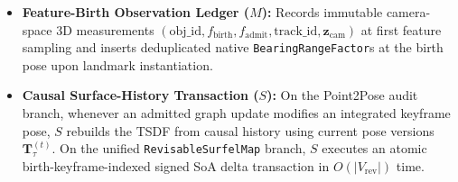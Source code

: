 \documentclass{evidencescene}
\begin{document}
\begin{itemize}
    Gate $R$ () executes four deterministic checks: (1) thin SVD landmark null-space projection $\bar{\mathbf{A}}_x=(\mathbf{I}-\mathbf{U}_{y,r}\mathbf{U}_{y,r}^\top)\mathbf{A}_x$ with $\tau_y=\epsilon_{\mathrm{mach}}\max(\operatorname{shape}(\mathbf{A}_y))\sigma_{\max}(\mathbf{A}_y)$; (2) worst-case multi-scale column-deletion rank $r_i^{\min}=\min_{s\in\{0.1,1,10\}}r_i(s)=6$; (3) continuous translational Schur conditioning on the $6\times 6$ pose marginal block $\mathbf{S}_i=(\bar{\mathbf{H}}_x)_{ii}-(\bar{\mathbf{H}}_x)_{i,-i}(\bar{\mathbf{H}}_x)_{-i,-i}^+(\bar{\mathbf{H}}_x)_{-i,i}$ and its $3\times 3$ translational complement $\mathbf{R}_i=\mathbf{S}_{i,tt}-\mathbf{S}_{i,tr}\mathbf{S}_{i,rr}^+\mathbf{S}_{i,rt}$, requiring $\sigma_{\min}(\mathbf{R}_i)\ge 10^{-4}$ and $\kappa(\mathbf{R}_i)\le 10^6$; and (4) atomic transaction retention on rejection. In \texttt{v2.4+}, for partially observable or rotationally symmetric objects where hard binary rejection is overly conservative,  decomposes $\mathbf{S}_i=\mathbf{V}\boldsymbol{\Lambda}\mathbf{V}^\top$ and projects the $\mathfrak{se}(3)$ tangent increment onto the well-conditioned subspace $\{\lambda_k\ge\tau_{\mathrm{obs}}\}$ while clamping null-space DoFs to the verified prior.
    \item \textbf{Feature-Birth Observation Ledger ($M$):} Records immutable camera-space 3D measurements $(\text{obj\_id},f_{\mathrm{birth}},f_{\mathrm{admit}},\text{track\_id},\mathbf{z}_{\mathrm{cam}})$ at first feature sampling and inserts deduplicated native \texttt{BearingRangeFactor}s at the birth pose upon landmark instantiation.
    \item \textbf{Causal Surface-History Transaction ($S$):} On the Point2Pose audit branch, whenever an admitted graph update modifies an integrated keyframe pose, $S$ rebuilds the TSDF from causal history using current pose versions $\mathbf{T}_\tau^{(t)}$. On the unified \texttt{RevisableSurfelMap} branch, $S$ executes an atomic birth-keyframe-indexed signed SoA delta transaction in $O(|V_{\mathrm{rev}}|)$ time.
\end{itemize}
\end{document}
